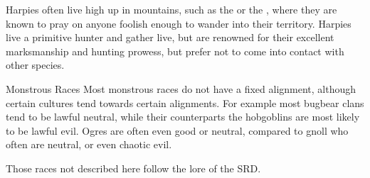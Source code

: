 Harpies often live high up in mountains, such as the 
or the , where they are known to pray on anyone
foolish enough to wander into their territory. Harpies live a primitive hunter
and gather live, but are renowned for their excellent marksmanship and hunting
prowess, but prefer not to come into contact with other species.

\begin{35e}{Monstrous Races}
  Most monstrous races do not have a fixed alignment, although certain
  cultures tend towards certain alignments. For example most bugbear clans
  tend to be lawful neutral, while their counterparts the hobgoblins are most
  likely to be lawful evil. Ogres are often even good or neutral, compared to
  gnoll who often are neutral, or even chaotic evil.

  Those races not described here follow the lore of the SRD.
\end{35e}
